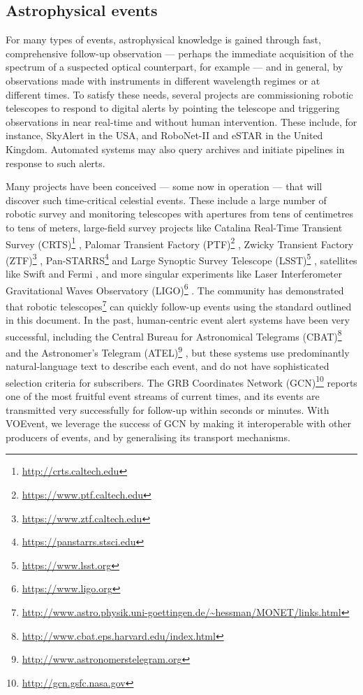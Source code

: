\documentclass[11pt,a4paper]{ivoa}
\begin{document}
\subsection{Astrophysical events}

For many types of events, astrophysical knowledge is gained through fast,
comprehensive follow-up observation --- perhaps the immediate acquisition of the
spectrum of a suspected optical counterpart, for example --- and in general, by
observations made with instruments in different wavelength regimes or at
different times. To satisfy these needs, several projects are commissioning
robotic telescopes to respond to digital alerts by pointing the telescope and
triggering observations in near real-time and without human intervention. These
include, for instance, SkyAlert \citep{bib05} in the USA, and RoboNet-II
\citep{bib12} and eSTAR \citep{bib03} in the United Kingdom. Automated systems
may also query archives and initiate pipelines in response to such alerts.

Many projects have been conceived --- some now in operation --- that will
discover such time-critical celestial events. These include a large number of
robotic survey and monitoring telescopes with apertures from tens of centimetres
to tens of meters, large-field survey projects like Catalina Real-Time Transient
Survey (CRTS)\footnote{\url{http://crts.caltech.edu}} \citep{bib08}, Palomar
Transient Factory (PTF)\footnote{\url{https://www.ptf.caltech.edu}}
\citep{bib31}, Zwicky Transient Factory
(ZTF)\footnote{\url{https://www.ztf.caltech.edu}} \citep{2014htu..conf...27B},
Pan-STARRS\footnote{\url{https://panstarrs.stsci.edu}} \citep{bib09} and Large
Synoptic Survey Telescope (LSST)\footnote{\url{https://www.lsst.org}}
\citep{bib07}, satellites like Swift \citep{bib11a} and Fermi \citep{bib11b},
and more singular experiments like Laser Interferometer Gravitational Waves
Observatory (LIGO)\footnote{\url{https://www.ligo.org}} \citep{bib06}. The
community has demonstrated that robotic
telescopes\footnote{\url{http://www.astro.physik.uni-goettingen.de/~hessman/MONET/links.html}}
can quickly follow-up events using the standard outlined in this document. In the
past, human-centric event alert systems have been very successful, including the
Central Bureau for Astronomical Telegrams
(CBAT)\footnote{\url{http://www.cbat.eps.harvard.edu/index.html}} and the
Astronomer's Telegram
(ATEL)\footnote{\url{http://www.astronomerstelegram.org}} \citep{bib01}, but
these systems use predominantly natural-language text to describe each event,
and do not have sophisticated selection criteria for subscribers. The GRB
Coordinates Network (GCN)\footnote{\url{http://gcn.gsfc.nasa.gov}} \citep{bib04}
reports one of the most fruitful event streams of current times, and its events
are transmitted very successfully for follow-up within seconds or minutes. With
VOEvent, we leverage the success of GCN by making it interoperable with other
producers of events, and by generalising its transport mechanisms.
\end{document}

